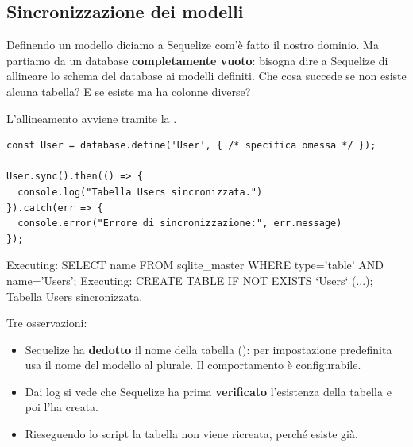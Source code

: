 
\subsection{Sincronizzazione dei modelli}

Definendo un modello diciamo a Sequelize com'è fatto il nostro dominio. Ma
partiamo da un database \textbf{completamente vuoto}: bisogna dire a Sequelize
di allineare lo schema del database ai modelli definiti. Che cosa succede se non
esiste alcuna tabella? E se esiste ma ha colonne diverse?

L'allineamento avviene tramite la .

\begin{affianco}[0.58][c]
\begin{lstlisting}[style=js, name=sync.js]
const User = database.define('User', { /* specifica omessa */ });

User.sync().then(() => {
  console.log("Tabella Users sincronizzata.")
}).catch(err => {
  console.error("Errore di sincronizzazione:", err.message)
});
\end{lstlisting}
\risultato
\begin{console}[Terminale]
Executing: SELECT name FROM
  sqlite_master WHERE type='table'
  AND name='Users';
Executing: CREATE TABLE IF NOT
  EXISTS `Users` (...);
Tabella Users sincronizzata.
\end{console}
\end{affianco}

Tre osservazioni:

\begin{itemize}
  \item Sequelize ha \textbf{dedotto} il nome della tabella (): per
        impostazione predefinita usa il nome del modello al plurale. Il
        comportamento è configurabile.
  \item Dai log si vede che Sequelize ha prima \textbf{verificato} l'esistenza
        della tabella e poi l'ha creata.
  \item Rieseguendo lo script la tabella non viene ricreata, perché esiste già.
\end{itemize}

